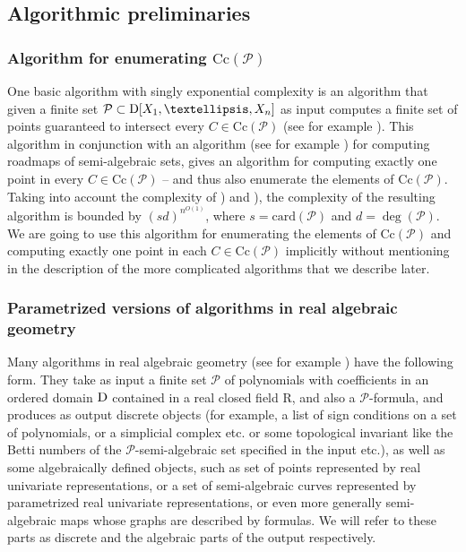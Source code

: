 \documentclass{amsart}[10pts]
\theoremstyle{definition}
\theoremstyle{remark}
\theoremstyle{observation}
\numberwithin{equation}{section}
\newcommand {\R} {\mathrm{R}}
\newcommand {\D}     {\mbox{\rm D}}
\newcommand{\card}{\mathrm{card}}
\newcommand{\Cc}{\mathrm{Cc}}
\begin{document}
\subsection{Algorithmic preliminaries}

\subsubsection{Algorithm for enumerating $\Cc(\mathcal{P})$}
\label{subsec:enumerating-CC}
One basic algorithm with singly exponential complexity is an algorithm
that given a finite set $\mathcal{P} \subset \D[X_1,\ldots,X_n]$ as input computes a finite set of points guaranteed to intersect every $C \in \Cc(\mathcal{P})$  (see for example \cite[Algorithm 13.2 (Sampling)]{BPRbook2}). This algorithm in conjunction with an algorithm 
(see for example \cite[Algorithm 16.4 (Uniform Roadmap)]{BPRbook2})
for computing roadmaps of semi-algebraic sets, gives an algorithm for
computing exactly one point in every $C \in \Cc(\mathcal{P})$ -- and thus also enumerate the elements of $\Cc(\mathcal{P})$. Taking into account the complexity of \cite[Algorithm 13.2 (Sampling)]{BPRbook2}) and
\cite[Algorithm 16.4 (Uniform Roadmap)]{BPRbook2}), the complexity of the resulting algorithm is bounded by $(sd)^{n^{O(1)}}$, where
$s = \card(\mathcal{P})$ and $d = \deg(\mathcal{P})$.
We are going to use this algorithm for enumerating the elements of 
$\Cc(\mathcal{P})$ and computing exactly one point in each $C \in \Cc(\mathcal{P})$ implicitly without mentioning in the description of the more complicated algorithms that we describe later. 



\subsubsection{Parametrized versions of algorithms in real algebraic geometry}
\label{subsec:parametrized}

Many algorithms in real algebraic geometry (see for example \cite[Chapters 13-16]{BPRbook2}) have the following form. They take as 
input a finite set $\mathcal{P}$ of polynomials with coefficients in an ordered  domain $\D$ contained in a real closed field $\R$, and also a $\mathcal{P}$-formula,
and produces as output 
discrete objects (for example, a list of sign conditions on a set of polynomials, or a simplicial complex etc. or some topological invariant like the Betti numbers of the $\mathcal{P}$-semi-algebraic set specified in the input etc.), as well as some algebraically defined objects, such as set of points represented by real univariate representations, or 
a set of semi-algebraic curves represented by parametrized real univariate representations, or even more generally semi-algebraic maps 
whose graphs are described by formulas. We will refer to these parts as discrete and the algebraic parts of the output respectively.
\end{document}
